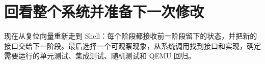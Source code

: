 \chapter{回看整个系统并准备下一次修改}

现在从复位向量重新走到 Shell：每个阶段都接收前一阶段留下的状态，并把新的
接口交给下一阶段。最后选择一个可观察现象，从系统调用找到接口和实现，确定
需要运行的单元测试、集成测试、随机测试和 QEMU 回归。







